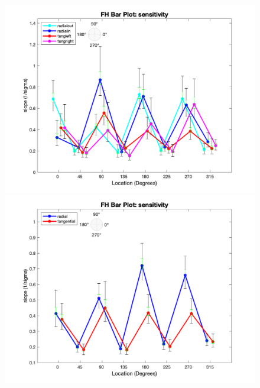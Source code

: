 \documentclass[11pt]{article} %
\begin{document}
\begin{figure}[H]
\centering %
\includegraphics[scale=.3]{Images/FH_LP_sensitivity_Alldata_4conds.png}
\includegraphics[scale=.3]{Images/FH_LP_sensitivity_Alldata_2conds.png}
\end{figure}
\end{document}
